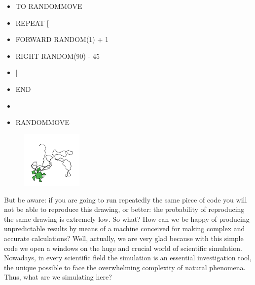 \begin{scriptsize}
\begin{minipage}{0.50\textwidth}
\begin{itemize}[itemsep=-3pt,parsep=2pt, leftmargin=-0.0mm ]
\item[] TO RANDOMMOVE
\item[] \hspace{8pt} 	REPEAT [ 
\item[] \hspace{8pt}\hspace{8pt}		FORWARD RANDOM(1) + 1 
\item[] \hspace{8pt}\hspace{8pt}		RIGHT RANDOM(90) - 45
\item[] \hspace{8pt}	]
\item[] END                            
\item[] 
\item[] RANDOMMOVE
\end{itemize}
\end{minipage}
\end{scriptsize}
\begin{minipage}{0.5\textwidth}
\begin{figure}[H]
   \includegraphics[width=3.0cm,trim=4 4 8 4,clip]{./images/decidere/decidere-1.png}
   \label{dec-2}
\end{figure}
\end{minipage} \hfill

\vskip 1cm

But be aware: if you are going to run repeatedly the same piece of code you will not be able to reproduce this drawing, or better: the probability of reproducing the same drawing is extremely low. So what? How can we be happy of producing unpredictable results by means of a machine conceived for making complex and accurate calculations? Well, actually, we are very glad because with this simple code we open a windows on the huge and crucial world of scientific simulation. Nowadays, in every scientific field the simulation is an essential investigation tool, the unique possible to face the overwhelming complexity of natural phenomena. Thus, what are we simulating here?





